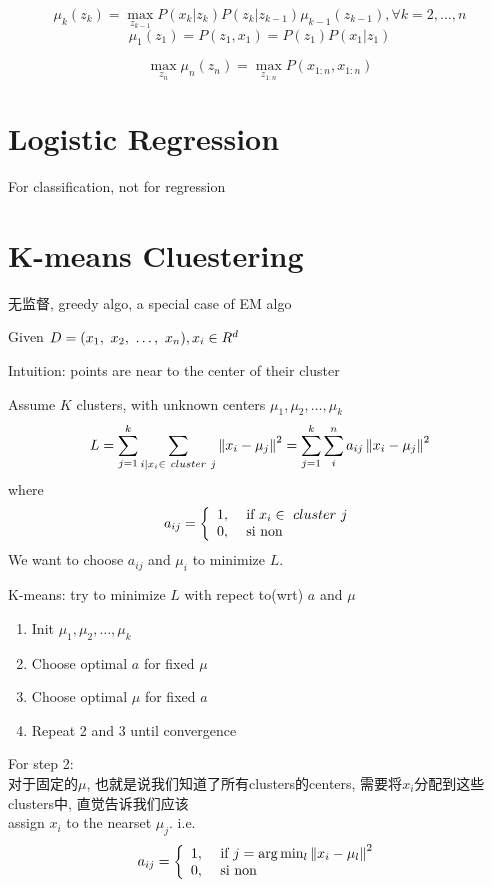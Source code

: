 \documentclass{article}
\begin{document}
$$ \mu_k(z_k) = \max_{z_{k-1}} P(x_k|z_k) P(z_k|z_{k-1}) \mu_{k-1}(z_{k-1}), \forall k = 2,\ldots,n $$
$$ \mu_1(z_1) = P(z_1, x_1) = P(z_1) P(x_1|z_1)$$

$$
\max_{z_n} \mu_n(z_n)
= \max_{z_{1:n}} P(x_{1:n}, x_{1:n})
$$

\section{Logistic Regression}
For classification, not for regression

\section{K-means Cluestering}
无监督, greedy algo, a special case of EM algo

Given $D = (x_1,~x_2,~\ldots,~x_n), x_i \in R^d$

Intuition: points are near to the center of their cluster

Assume $K$ clusters, with unknown centers $\mu_1, \mu_2, \ldots, \mu_k$
$$
L
= \sum_{j = 1}^k \sum_{i | x_i \in\ cluster\ j}\left\Vert x_i - \mu_j\right\Vert^2
= \sum_{j = 1}^k \sum_i^n a_{ij}\left\Vert x_i - \mu_j\right\Vert^2
$$
where
$$
a_{ij} =
\left\{
  \begin{array}{ll}
    1, & \textrm{\ if } x_i \in\ cluster\ j\\
    0, & \textrm{ si non}
  \end{array}
\right.
$$
We want to choose $a_{ij}$ and $\mu_i$ to minimize $L$.

K-means: try to minimize $L$ with repect to(wrt) $a$ and $\mu$
\begin{enumerate}
\item Init $\mu_1, \mu_2, \ldots, \mu_k$
\item Choose optimal $a$ for fixed $\mu$
\item Choose optimal $\mu$ for fixed $a$
\item Repeat 2 and 3 until convergence
\end{enumerate}

For step 2:\\
对于固定的$\mu$, 也就是说我们知道了所有clusters的centers, 需要将$x_i$分配到这些clusters中, 直觉告诉我们应该\\
assign $x_i$ to the nearset $\mu_j$. i.e.
$$
a_{ij} =
\left\{
  \begin{array}{ll}
  1, & \textrm{\ if } j = \arg \min_l \left\Vert x_i - \mu_l\right\Vert^2\\
    0, & \textrm{ si non}
  \end{array}
\right.
$$
\end{document}
